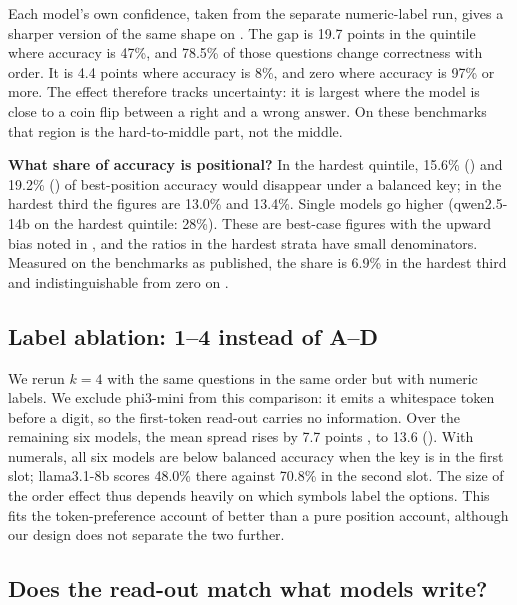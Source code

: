 Each model's own confidence, taken from the separate numeric-label run, gives a sharper version of the same shape on \mmlu.
The gap is 19.7  points in the quintile where accuracy is 47\%, and 78.5\% of those questions change correctness with order.
It is 4.4 points where accuracy is 8\%, and zero where accuracy is 97\% or more.
The effect therefore tracks uncertainty: it is largest where the model is close to a coin flip between a right and a wrong answer.
On these benchmarks that region is the hard-to-middle part, not the middle.

{\bf What share of accuracy is positional?}
In the hardest quintile, 15.6\% (\mmlu) and 19.2\% (\csqa) of best-position accuracy would disappear under a balanced key; in the hardest third the figures are 13.0\% and 13.4\%.
Single models go higher (qwen2.5-14b on the hardest \csqa quintile: 28\%).
These are best-case figures with the upward bias noted in , and the ratios in the hardest strata have small denominators.
Measured on the benchmarks as published, the share is 6.9\%  in the hardest \mmlu third and indistinguishable from zero on \csqa.

\subsection{Label ablation: 1--4 instead of A--D}
\label{sec:labels}



We rerun \mmlu $k{=}4$ with the same questions in the same order but with numeric labels.
We exclude phi3-mini from this comparison: it emits a whitespace token before a digit, so the first-token read-out carries no information.
Over the remaining six models, the mean spread rises by 7.7 points , to 13.6 ().
With numerals, all six models are below balanced accuracy when the key is in the first slot; llama3.1-8b scores 48.0\% there against 70.8\% in the second slot.
The size of the order effect thus depends heavily on which symbols label the options.
This fits the token-preference account of \citet{zheng2024selectors} better than a pure position account, although our design does not separate the two further.

\subsection{Does the read-out match what models write?}
\label{sec:readout}


